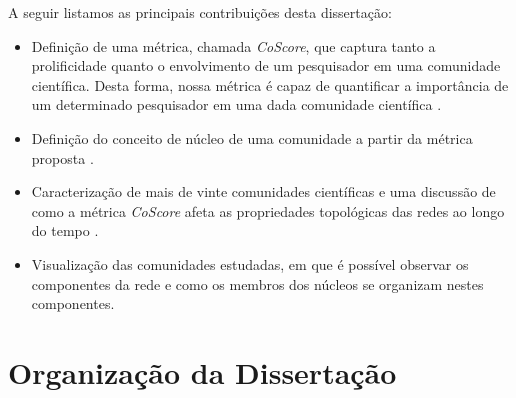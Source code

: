 A seguir listamos as principais contribuições desta dissertação:

\begin{itemize}
 \item Definição de uma métrica, chamada \textit{CoScore}, que captura tanto a prolificidade quanto o 
       envolvimento de um pesquisador em uma comunidade científica. Desta forma, nossa métrica é capaz 
       de quantificar a importância de um determinado pesquisador em uma dada comunidade científica \citep{Alves2013}.
 \item Definição do conceito de núcleo de uma comunidade a partir da métrica proposta \citep{Alves2013}.
 \item Caracterização de mais de vinte comunidades científicas e uma discussão de como a métrica \textit{CoScore} afeta 
       as propriedades topológicas das redes ao longo do tempo \citep{Alves2013}.
 \item Visualização das comunidades estudadas, em que é possível observar os componentes da rede e como os membros 
       dos núcleos se organizam nestes componentes.
 
\end{itemize}




\section{Organização da Dissertação}

